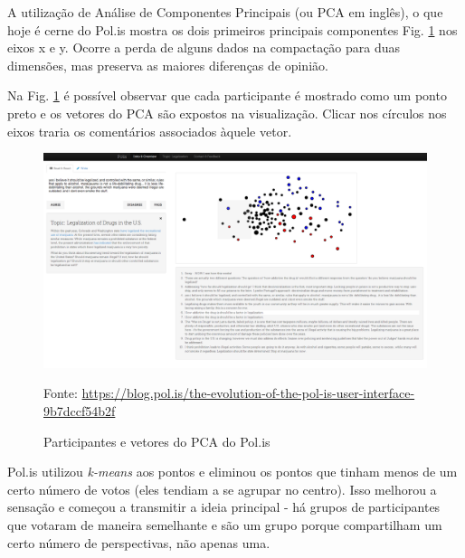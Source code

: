 




A utilização de Análise de Componentes Principais (ou PCA em inglês), o que hoje é cerne do Pol.is mostra os dois primeiros principais componentes Fig. \ref{fig02} nos eixos x e y. Ocorre a perda de alguns dados na compactação para duas dimensões, mas preserva as maiores diferenças de opinião. 

Na Fig. \ref{fig02} é possível observar que cada participante é mostrado como um ponto preto e os vetores do PCA são expostos na visualização. Clicar nos círculos nos eixos traria os comentários associados àquele vetor.%


\begin{figure}[h]
	\centering
	\includegraphics[keepaspectratio=true,scale=0.2]{figuras/evolucao-polis-2.png}
	\caption{Participantes e vetores do PCA do Pol.is}
	Fonte: \url{https://blog.pol.is/the-evolution-of-the-pol-is-user-interface-9b7dccf54b2f}
	\label{fig02}
\end{figure}


Pol.is utilizou \textit{k-means} aos pontos e eliminou os pontos que tinham menos de um certo número de votos (eles tendiam a se agrupar no centro). Isso melhorou a sensação e começou a transmitir a ideia principal - há grupos de participantes que votaram de maneira semelhante e são um grupo porque compartilham um certo número de perspectivas, não apenas uma.

